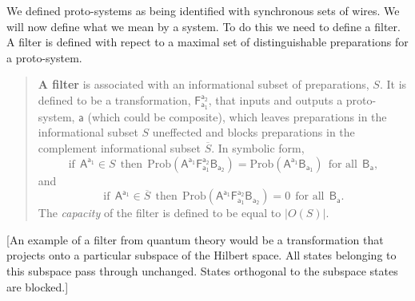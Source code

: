 \documentclass[10pt]{article}
\begin{document}
We defined proto-systems as being identified with synchronous sets of wires.  We will now define what we mean by a system. To do this we need to define a filter. A filter is defined with repect to a maximal set of distinguishable preparations for a proto-system.
\begin{quote}
{\bf A filter} is associated with an informational subset of preparations, $S$.  It is defined to be a transformation, $\mathsf{F_{a_1}^{a_2}}$, that inputs and outputs a proto-system, $\mathsf a$ (which could be composite), which leaves preparations in the informational subset $S$ uneffected and blocks preparations in the complement informational subset $\overline S$. In symbolic form,
\begin{equation} \label{filtera}
\text{if}~~\mathsf{A^{a_1}}\in S ~~\text{then}~~ \text{Prob}(\mathsf{A^{a_1} F_{a_1}^{a_2} B_{a_2}})= \text{Prob}(\mathsf{A^{a_1}  B_{a_1}}) ~~ \text{for all} ~~ \mathsf{B_a},
\end{equation}
and
\begin{equation}\label{filterb}
\text{if}~~\mathsf{A^{a_1}}\in \overline S ~~\text{then}~~  \text{Prob}(\mathsf{A^{a_1} F_{a_1}^{a_2}B_{a_2}})=0 ~~ \text{for all}~~ \mathsf{B_a}.
\end{equation}
The \emph{capacity}  of the filter is defined to be equal to $|O(S)|$.
\end{quote}
[An example of a filter from quantum theory would be a transformation that projects onto a particular subspace of the Hilbert space.  All states belonging to this subspace pass through unchanged.  States orthogonal to the subspace states are blocked.]
\end{document}
